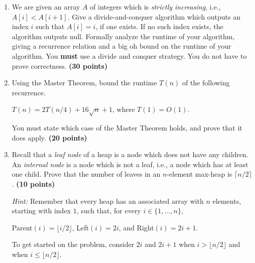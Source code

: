 \documentclass[11pt]{amsart}
\begin{document}
\begin{enumerate}
\item We are given an array $A$ of integers which is \textit{strictly increasing}, i.e., $A[i] < A[i+1]$. Give a divide-and-conquer algorithm which outputs an index $i$ such that $A[i] = i$, if one exists. If no such index exists, the algorithm outputs null. Formally analyze the runtime of your algorithm, giving a recurrence relation and a big oh bound on the runtime of your algorithm. You \textbf{must} use a divide and conquer strategy. You do not have to prove correctness. \textbf{(30 points)}

\bigskip

\item Using the Master Theorem, bound the runtime $T(n)$ of the following recurrence. 
\begin{center}
$T(n) = 2T(n/4) + 16\sqrt{n} + 1$, where $T(1) = O(1)$.
\end{center}
You must state which case of the Master Theorem holds, and prove that it does apply. \textbf{(20 points)}
\\

\bigskip

\item Recall that a \textit{leaf node} of a heap is a node which does not have any children. An \textit{internal node} is a node which is not a leaf, i.e., a node which has at least one child. Prove that the number of leaves in an $n$-element max-heap is $\lceil n / 2 \rceil$. \textbf{(10 points)}

\smallskip

\textit{Hint: } Remember that every heap has an associated array with $n$ elements, starting with index $1$, such that, for every $i \in \{1,\ldots,n\}$,
\begin{center}
Parent$(i) = \lfloor i / 2 \rfloor$, Left$(i) = 2i$, and Right$(i) = 2i+1$.
\end{center}
To get started on the problem, consider $2i$ and $2i+1$ when $i > \lfloor n / 2 \rfloor$ and when $i \leq \lfloor n / 2 \rfloor$.
\end{enumerate}
\end{document}
